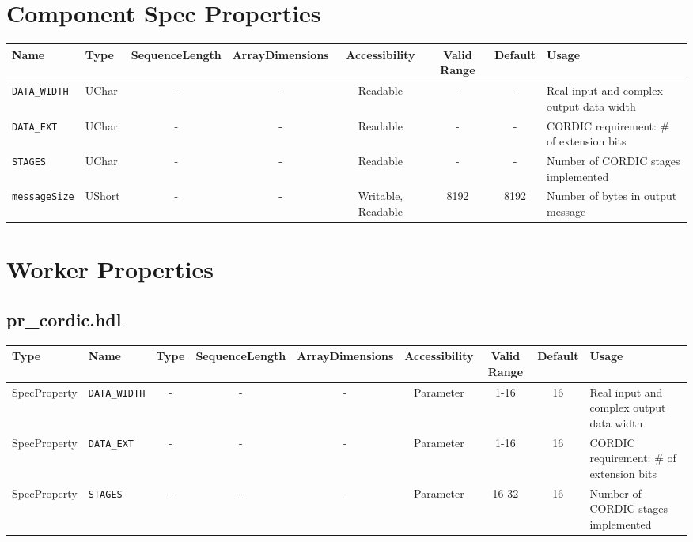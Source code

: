 \documentclass{article}
\def\comp{pr\_cordic}
\begin{document}
\begin{landscape}
	\section*{Component Spec Properties}
	\begin{scriptsize}
		\begin{tabular}{|p{3cm}|p{1.5cm}|c|c|c|c|c|p{7cm}|}
			\hline
			\rowcolor{blue}
			Name                & Type   & SequenceLength & ArrayDimensions & Accessibility      & Valid Range & Default & Usage                                    \\
			\hline
			\verb+DATA_WIDTH+   & UChar  & -              & -               & Readable           & -           & -       & Real input and complex output data width \\
			\hline
			\verb+DATA_EXT+     & UChar  & -              & -               & Readable           & -           & -       & CORDIC requirement: \# of extension bits \\
			\hline
			\verb+STAGES+       & UChar  & -              & -               & Readable           & -           & -       & Number of CORDIC stages implemented      \\
			\hline
			\verb+messageSize+ & UShort & -              & -               & Writable, Readable & 8192        & 8192    & Number of bytes in output message        \\
			\hline
		\end{tabular}
	\end{scriptsize}

	\section*{Worker Properties}
	\subsection*{\comp.hdl}
	\begin{scriptsize}
		\begin{tabular}{|p{2cm}|p{1.5cm}|c|c|c|c|c|c|p{7cm}|}
			\hline
			\rowcolor{blue}
			Type         & Name              & Type & SequenceLength & ArrayDimensions & Accessibility & Valid Range & Default & Usage                                    \\
			\hline
			SpecProperty & \verb+DATA_WIDTH+ & -    & -              & -               & Parameter     & 1-16        & 16      & Real input and complex output data width \\
			\hline
			SpecProperty & \verb+DATA_EXT+   & -    & -              & -               & Parameter     & 1-16        & 16      & CORDIC requirement: \# of extension bits \\
			\hline
			SpecProperty & \verb+STAGES+     & -    & -              & -               & Parameter     & 16-32       & 16      & Number of CORDIC stages implemented      \\
			\hline
		\end{tabular}
	\end{scriptsize}


\end{landscape}
\end{document}
